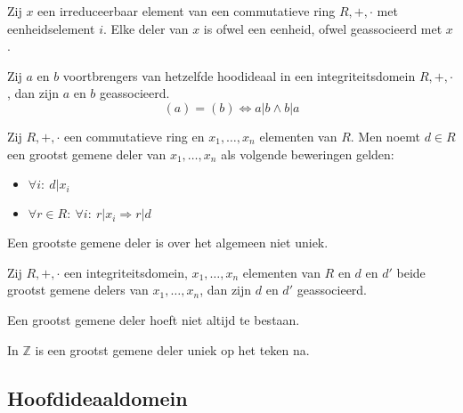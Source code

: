 \documentclass[main.tex]{subfiles}
\begin{document}
\begin{ei}
  Zij $x$ een irreduceerbaar element van een commutatieve ring $R,+,\cdot$ met eenheidselement $i$.
  Elke deler van $x$ is ofwel een eenheid, ofwel geassocieerd met $x$.
\end{ei}

\begin{gev}
  Zij $a$ en $b$ voortbrengers van hetzelfde hoodideaal in een integriteitsdomein $R,+,\cdot$, dan zijn $a$ en $b$ geassocieerd.
  \[ (a) = (b) \Leftrightarrow a|b \wedge b|a \]
\end{gev}

\begin{de}
  Zij $R,+,\cdot$ een commutatieve ring en $x_{1},\dotsc,x_{n}$ elementen van $R$.
  Men noemt $d\in R$ een grootst gemene deler van $x_{1},\dotsc,x_{n}$ als volgende beweringen gelden:
  \begin{itemize}
  \item $\forall i:\ d|x_{i}$
  \item $\forall r \in R:\ \forall i:\ r|x_{i} \Rightarrow r|d$
  \end{itemize}
\end{de}

\begin{opm}
  Een grootste gemene deler is over het algemeen niet uniek.
\end{opm}

\begin{ei}
  Zij $R,+,\cdot$ een integriteitsdomein, $x_{1},\dotsc,x_{n}$ elementen van $R$ en $d$ en $d'$ beide grootst gemene delers van $x_{1},\dotsc,x_{n}$, dan zijn $d$ en $d'$ geassocieerd.
\end{ei}

\begin{opm}
  Een grootst gemene deler hoeft niet altijd te bestaan.
\end{opm}

\begin{opm}
  In $\mathbb{Z}$ is een grootst gemene deler uniek op het teken na.
\end{opm}

\subsection{Hoofdideaaldomein}
\label{sec:hoofdideaaldomein}
\end{document}
